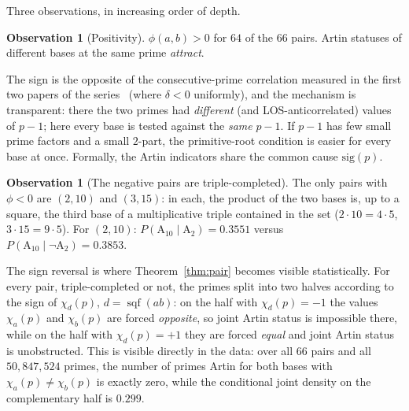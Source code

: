 \documentclass[11pt,reqno]{amsart}
\theoremstyle{plain}
\theoremstyle{definition}
\newtheorem{observation}[theorem]{Observation}
\DeclareMathOperator{\sqf}{sqf}
\newcommand{\Art}{\mathrm{A}}
\begin{document}
Three observations, in increasing order of depth.

\begin{observation}[Positivity]
\label{obs:positive}
$\phi(a, b) > 0$ for $64$ of the $66$ pairs. Artin statuses of different
bases at the same prime \emph{attract}.
\end{observation}

The sign is the opposite of the consecutive-prime correlation measured in the
first two papers of the series~\cite{BaldI, BaldII} (where $\delta < 0$ uniformly), and the
mechanism is transparent: there the two primes had \emph{different} (and
LOS-anticorrelated) values of $p - 1$; here every base is tested against the
\emph{same} $p - 1$. If $p - 1$ has few small prime factors and a small
$2$-part, the primitive-root condition is easier for every base at once.
Formally, the Artin indicators share the common cause $\mathrm{sig}(p)$.

\begin{observation}[The negative pairs are triple-completed]
\label{obs:negative}
The only pairs with $\phi < 0$ are $(2, 10)$ and $(3, 15)$: in each, the
product of the two bases is, up to a square, the third base of a
multiplicative triple contained in the set ($2 \cdot 10 = 4 \cdot 5$,
$3 \cdot 15 = 9 \cdot 5$). For $(2, 10)$:
$P(\Art_{10} \mid \Art_2) = 0.3551$ versus
$P(\Art_{10} \mid \lnot\Art_2) = 0.3853$.
\end{observation}

The sign reversal is where Theorem~\ref{thm:pair} becomes visible statistically. For every pair, triple-completed or not, the primes split into two halves according to the sign
of $\chi_d(p)$, $d = \sqf(ab)$: on the half with $\chi_d(p) = -1$ the values
$\chi_a(p)$ and $\chi_b(p)$ are forced \emph{opposite}, so joint Artin status
is impossible there, while on the half with $\chi_d(p) = +1$ they are forced
\emph{equal} and joint Artin status is unobstructed. This is visible directly
in the data: over all $66$ pairs and all $50{,}847{,}524$ primes, the number of
primes Artin for both bases with $\chi_a(p) \ne \chi_b(p)$ is exactly zero,
while the conditional joint density on the complementary half is
$0.299$.
\end{document}

